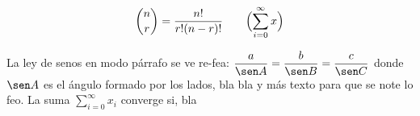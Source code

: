 \begin{equation*}
\binom{n}{r} = \frac{n!}{r!(n-r)!}\qquad
\Bigl(\sum_{i=0}^{\infty} x \Bigr)
\end{equation*}

La ley de senos en modo párrafo se ve re-fea: $\displaystyle{\frac{a}{\sen A} =\frac{b}{\sen B} = \frac{c}{\sen C}}$ donde $\sen A$ es el ángulo formado por los lados, bla bla y más texto para que se note lo feo. La suma $\sum_{i=0}^{\infty} x_i$ converge si, bla
\endinput